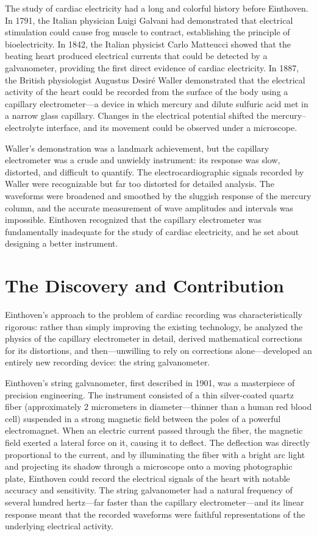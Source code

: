 The study of cardiac electricity had a long and colorful history before Einthoven. In 1791, the Italian physician Luigi Galvani had demonstrated that electrical stimulation could cause frog muscle to contract, establishing the principle of bioelectricity. In 1842, the Italian physicist Carlo Matteucci showed that the beating heart produced electrical currents that could be detected by a galvanometer, providing the first direct evidence of cardiac electricity. In 1887, the British physiologist Augustus Desiré Waller demonstrated that the electrical activity of the heart could be recorded from the surface of the body using a capillary electrometer---a device in which mercury and dilute sulfuric acid met in a narrow glass capillary. Changes in the electrical potential shifted the mercury--electrolyte interface, and its movement could be observed under a microscope.\cite{einthoven-history}

Waller's demonstration was a landmark achievement, but the capillary electrometer was a crude and unwieldy instrument: its response was slow, distorted, and difficult to quantify. The electrocardiographic signals recorded by Waller were recognizable but far too distorted for detailed analysis. The waveforms were broadened and smoothed by the sluggish response of the mercury column, and the accurate measurement of wave amplitudes and intervals was impossible. Einthoven recognized that the capillary electrometer was fundamentally inadequate for the study of cardiac electricity, and he set about designing a better instrument.

\section{The Discovery and Contribution}

Einthoven's approach to the problem of cardiac recording was characteristically rigorous: rather than simply improving the existing technology, he analyzed the physics of the capillary electrometer in detail, derived mathematical corrections for its distortions, and then---unwilling to rely on corrections alone---developed an entirely new recording device: the string galvanometer.

Einthoven's string galvanometer, first described in 1901, was a masterpiece of precision engineering. The instrument consisted of a thin silver-coated quartz fiber (approximately 2 micrometers in diameter---thinner than a human red blood cell) suspended in a strong magnetic field between the poles of a powerful electromagnet. When an electric current passed through the fiber, the magnetic field exerted a lateral force on it, causing it to deflect. The deflection was directly proportional to the current, and by illuminating the fiber with a bright arc light and projecting its shadow through a microscope onto a moving photographic plate, Einthoven could record the electrical signals of the heart with notable accuracy and sensitivity. The string galvanometer had a natural frequency of several hundred hertz---far faster than the capillary electrometer---and its linear response meant that the recorded waveforms were faithful representations of the underlying electrical activity.


